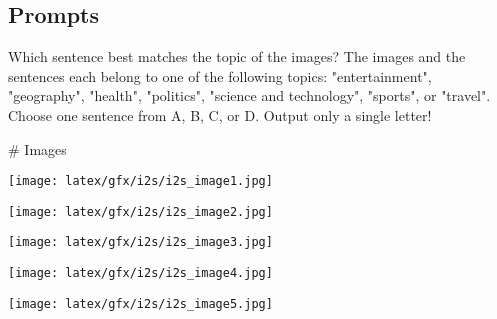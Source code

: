 \clearpage

\begin{figure*}[ht]
\subsection{Prompts}
\label{appendix:prompts}

\begin{tcolorbox}[
    colback=white!95!black,    %
    colframe=black,            %
    title=Images-To-Sentences (\its), %
    fonttitle=\bfseries,       %
    boxrule=0.5pt,             %
    arc=4pt,                   %
    outer arc=4pt,
    width=\textwidth,          %
    enlarge left by=0mm,
    enlarge right by=0mm,
    before skip=1em,           %
    after skip=1em,            %
]

Which sentence best matches the topic of the images? The images and the sentences each belong
to one of the following topics: "entertainment", "geography", "health", "politics", "science and technology", "sports", or "travel". Choose one sentence from A, B, C, or D. Output only 
a single letter!

\medskip

\# Images

\begin{center}
    \begin{minipage}{0.18\textwidth}
        \centering
        \texttt{[image: latex/gfx/i2s/i2s\_image1.jpg]}
    \end{minipage}
    \hfill
    \begin{minipage}{0.18\textwidth}
        \centering
        \texttt{[image: latex/gfx/i2s/i2s\_image2.jpg]}
    \end{minipage}
    \hfill
    \begin{minipage}{0.18\textwidth}
        \centering
        \texttt{[image: latex/gfx/i2s/i2s\_image3.jpg]}
    \end{minipage}
    \hfill
    \begin{minipage}{0.18\textwidth}
        \centering
        \texttt{[image: latex/gfx/i2s/i2s\_image4.jpg]}
    \end{minipage}
    \hfill
    \begin{minipage}{0.18\textwidth}
        \centering
        \texttt{[image: latex/gfx/i2s/i2s\_image5.jpg]}
    \end{minipage}
\end{center}


\end{tcolorbox}
\end{figure*}

